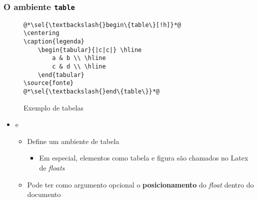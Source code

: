 \begin{frame}[fragile] \frametitle{O ambiente \texttt{table}}
\vspace{-0.5cm}
\begin{figure}[!t]
\caption{Exemplo de tabelas}
\begin{lstlisting}
@*\sel{\textbackslash{}begin\{table\}[!h]}*@
\centering
\caption{legenda}
	\begin{tabular}{|c|c|} \hline
		a & b \\ \hline
		c & d \\ \hline
	\end{tabular}
\source{fonte}
@*\sel{\textbackslash{}end\{table\}}*@
\end{lstlisting}
\ownsrc
\end{figure}

\begin{itemize}
	\item {} e 
	\begin{itemize}
		\item Define um ambiente de tabela
		\begin{itemize}
			\item Em especial, elementos como tabela e figura são chamados no Latex de \textit{floats}
		\end{itemize}
		\item Pode ter como argumento opcional o \textbf{posicionamento} do \textit{float} dentro do documento
	\end{itemize}
\end{itemize}
\end{frame}

